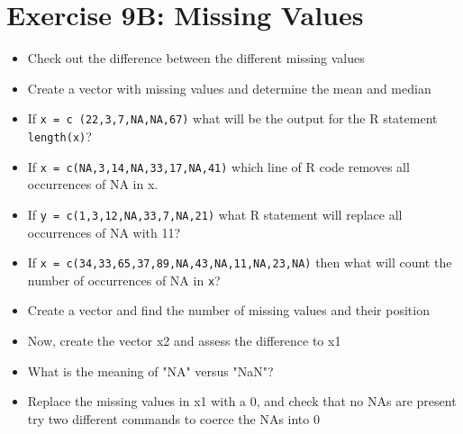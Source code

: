 \documentclass[11pt]{article}\usepackage[]{graphicx}\usepackage[]{color}
\begin{document}
\section*{Exercise 9B: Missing Values}
\begin{itemize}
\item Check out the difference between the different missing values

%
\item Create a vector with missing values and determine the mean and median

%
\item If \texttt{x = c (22,3,7,NA,NA,67)} what will be the output for the R
statement \texttt{length(x)}?

%
\item If \texttt{x = c(NA,3,14,NA,33,17,NA,41)} which line of R code removes
all occurrences of NA in x.

%
\item If \texttt{y = c(1,3,12,NA,33,7,NA,21)} what R statement will replace
all occurrences of NA with 11?

%
\item If \texttt{x = c(34,33,65,37,89,NA,43,NA,11,NA,23,NA)} then what will
count the number of occurrences of NA in \texttt{x}?

%
\item Create a vector and find the number of missing values and their position

%
\item Now, create the vector x2 and assess the difference to x1

%
\item What is the meaning of "NA" versus "NaN"?
%
\item Replace the missing values in x1 with a 0, and check that no NAs are present
try two different commands to coerce the NAs into 0

\end{itemize}
%
\end{document}
